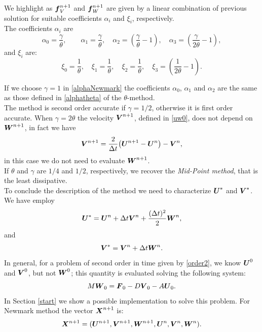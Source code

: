 \documentclass[english,a4paper]{article}
\newcommand{\Xbf}{\text{\mbox{\boldmath $X$}}}
\newcommand{\Ubf}{\text{\mbox{\boldmath $U$}}}
\newcommand{\Abf}{\text{\mbox{\boldmath $W$}}}
\newcommand{\fbf}{\text{\mbox{\boldmath $f$}}}
\newcommand{\Fbf}{\text{\mbox{\boldmath $F$}}}
\newcommand{\Wbf}{\text{\mbox{\boldmath $V$}}}
\begin{document}
 We highlight as $\fbf_V^{n+1}$ and $\fbf_W^{n+1}$ are given by a linear
 combination of previous solution for  suitable coefficients $\alpha_i$
 and $\xi_i$, respectively. \\
The coefficients $\alpha_i$ are
\begin{equation}\label{alphaNewmark} 
\displaystyle\alpha_{0}=\frac{\gamma}{\theta}, \qquad
\displaystyle\alpha_{1}=\frac{\gamma}{\theta},
\quad\displaystyle\alpha_2=\left(\frac{\gamma}{\theta}-1\right),\quad
\displaystyle\alpha_3=\left(\frac{\gamma}{2\theta}-1\right),
\end{equation}
and $\xi_i$ are:
\begin{equation}\label{xiNewmark}  
\xi_{0}=\frac{1}{\theta},\quad\displaystyle\xi_{1}=\frac{1}{\theta},
\quad \displaystyle\xi_2=\frac{1}{\theta},\quad
\displaystyle\xi_3=(\frac{1}{2\theta}-1).
\end{equation}

If we choose $\gamma=1$ in \eqref{alphaNewmark} the coefficients
$\alpha_0$, $\alpha_1$ and $\alpha_2$ are the same as those defined in
\eqref{alphatheta} of the
$\theta$-method.\\
The method is second order  accurate if  $\gamma=1/2$,
otherwise it is  first order accurate.
 When $\gamma=2\theta$ the velocity $\Wbf^{n+1}$, defined in
 \eqref{uw0}, does not depend on $\Abf^{n+1}$, in fact we have 
\begin{equation*}
\Wbf^{n+1}=\frac{2}{\Delta
  t}\big(\Ubf^{n+1}-\Ubf^n\big)-\Wbf^{n},
\end{equation*}
in this case we do not need to evaluate $\Abf^{n+1}$.\\
 If $\theta$ and   $\gamma$ are $1/4$ and $1/2$, respectively, we recover the
\emph{Mid-Point method}, that is the least dissipative.
\\
To conclude the description of the method we need to characterize
$\Ubf^*$ and $\Wbf^*$. We have employ
$$\Ubf^*=\Ubf^n + \Delta t \Wbf^n + \frac{(\Delta t)^2}{2} \Abf^n, $$
and
$$ \Wbf^*= \Wbf^n + \Delta t \Abf^{n}. $$
In general, for a problem of second order in time given by \eqref{order2}, we
know  $\Ubf^0$ and $\Wbf^0$, but not $\Abf^0$; this quantity is
evaluated solving  the following system:
 $$M \Abf_0= \Fbf_0 - D \Wbf_0 - A \Ubf_0.$$
In  Section \ref{start} we show a possible implementation to solve
this problem.
For  Newmark method the vector $\Xbf^{n+1}$ is:
$$\Xbf^{n+1}=(\Ubf^{n+1},\Wbf^{n+1}, \Abf^{n+1}, \Ubf^n, \Wbf^n, \Abf^n).$$
\end{document}
